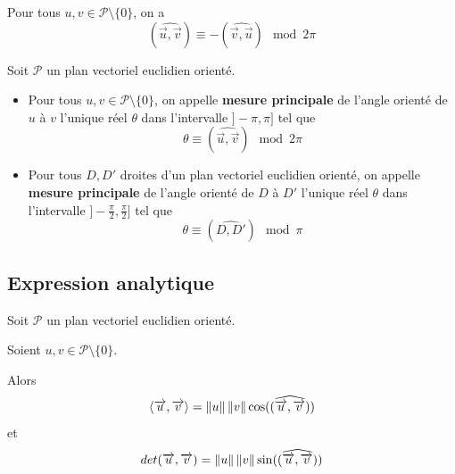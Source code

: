\documentclass[a4paper,12pt]{article}
\begin{document}
\begin{corollaire}{}{}
    Pour tous $u, v \in \mathcal{P}\setminus\{0\}$, on a
    $$
    (\widehat{\overrightarrow{u}, \overrightarrow{v}}) \equiv -(\widehat{\overrightarrow{v}, \overrightarrow{u}}) \mod 2\pi
    $$
\end{corollaire}

\begin{definition}
    Soit $\mathcal{P}$ un plan vectoriel euclidien orienté.

    \begin{itemize}
        \item Pour tous $u, v \in \mathcal{P}\setminus\{0\}$, on appelle \textbf{mesure principale} de l'angle orienté de $u$ à $v$ l'unique réel $\theta$ dans l'intervalle $]-\pi, \pi]$ tel que $$\theta \equiv (\widehat{\overrightarrow{u}, \overrightarrow{v}}) \mod 2\pi$$
        \item Pour tous $D, D'$ droites d'un plan vectoriel euclidien orienté, on appelle \textbf{mesure principale} de l'angle orienté de $D$ à $D'$ l'unique réel $\theta$ dans l'intervalle $]-\frac{\pi}{2}, \frac{\pi}{2}]$ tel que $$\theta \equiv (\widehat{D, D'}) \mod \pi$$
    \end{itemize}
\end{definition}

\subsection{Expression analytique}

\begin{theoreme}{}{}
    Soit $\mathcal{P}$ un plan vectoriel euclidien orienté.

    Soient $u, v \in \mathcal{P}\setminus\{0\}$.

    Alors
    $$
    \langle\overrightarrow{u}, \overrightarrow{v}\rangle = \left\lVert u\right\rVert\left\lVert v\right\rVert\cos((\widehat{\overrightarrow{u}, \overrightarrow{v}}))
    $$
    et
    $$
    det(\overrightarrow{u}, \overrightarrow{v}) = \left\lVert u\right\rVert\left\lVert v\right\rVert\sin((\widehat{\overrightarrow{u}, \overrightarrow{v}}))
    $$
\end{theoreme}
\end{document}
